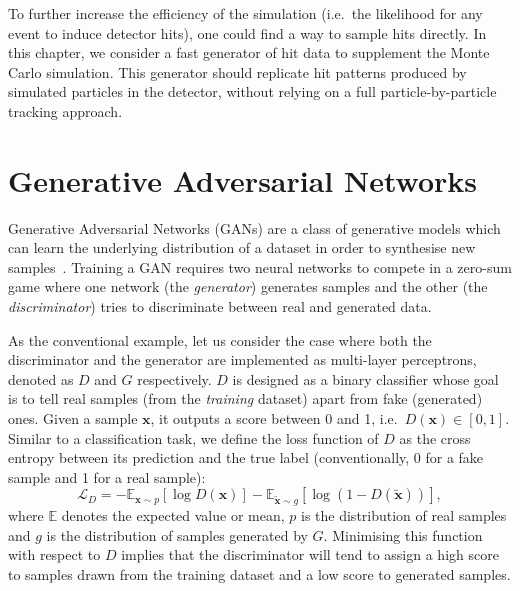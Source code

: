 To further increase the efficiency of the simulation (i.e.\ the likelihood for any event to induce detector hits), one could find a way to sample hits directly.
In this chapter, we consider a fast generator of hit data to supplement the Monte Carlo simulation. This generator should replicate hit patterns produced by simulated particles in the detector, without relying on a full particle-by-particle tracking approach.



\section{Generative Adversarial Networks}
Generative Adversarial Networks (GANs) are a class of generative models which can learn the underlying distribution of a dataset in order to synthesise new samples~\cite{goodfellow_generative_2014}. Training a GAN requires two neural networks to compete in a zero-sum game where one network (the \emph{generator}) generates samples and the other (the \emph{discriminator}) tries to discriminate between real and generated data.

As the conventional example, let us consider the case where both the discriminator and the generator are implemented as multi-layer perceptrons, denoted as $D$ and $G$ respectively. $D$ is designed as a binary classifier whose goal is to tell real samples (from the \emph{training} dataset) apart from fake (generated) ones. Given a sample $\mathbf{x}$, it outputs a score between 0 and 1, i.e.\ $D(\mathbf{x}) \in [0, 1]$. Similar to a classification task, we define the loss function of $D$ as the cross entropy between its prediction and the true label (conventionally, 0 for a fake sample and 1 for a real sample):
\begin{equation}\label{eq:D_loss}
    \mathcal{L}_D = 
    -\mathbb{E}_{\mathbf{x} \sim p} [ \log D(\mathbf{x}) ] -
    \mathbb{E}_{\tilde{\mathbf{x}} \sim g} [ \log( 1 - D(\tilde{\mathbf{x}}) )],
\end{equation}
where $\mathbb{E}$ denotes the expected value or mean, $p$ is the distribution of real samples and $g$ is the distribution of samples generated by $G$.
Minimising this function with respect to $D$ implies that the discriminator will tend to assign a high score to samples drawn from the training dataset and a low score to generated samples.


